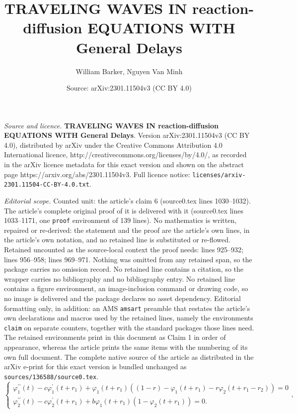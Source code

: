 \documentclass[10pt,a4paper]{amsart}
\title{\textbf{TRAVELING WAVES IN reaction-diffusion EQUATIONS WITH General Delays}}
\author{William Barker, Nguyen Van Minh}
\date{Source: arXiv:2301.11504v3 (CC BY 4.0)}
\begin{document}
\maketitle

\noindent\emph{Source and licence.} \textbf{TRAVELING WAVES IN reaction-diffusion EQUATIONS WITH General Delays}. Version arXiv:2301.11504v3 (CC BY 4.0), distributed by arXiv under the Creative Commons Attribution 4.0 International licence, http://creativecommons.org/licenses/by/4.0/, as recorded in the arXiv licence metadata for this exact version and shown on the abstract page https://arxiv.org/abs/2301.11504v3. Full licence notice: \texttt{licenses/arxiv-2301.11504-CC-BY-4.0.txt}.\par\smallskip

\noindent\textit{Editorial scope.} Counted unit: the article's claim 6 (source0.tex lines 1030--1032). The article's complete original proof of it is delivered with it (source0.tex lines 1033--1171, one \texttt{proof} environment of 139 lines). No mathematics is written, repaired or re-derived: the statement and the proof are the article's own lines, in the article's own notation, and no retained line is substituted or re-flowed.  Retained uncounted as the source-local context the proof needs: lines 925--932; lines 956--958; lines 969--971.  Nothing was omitted from any retained span, so the package carries no omission record.  No retained line contains a citation, so the wrapper carries no bibliography and no bibliography entry.  No retained line contains a figure environment, an image-inclusion command or drawing code, so no image is delivered and the package declares no asset dependency.  Editorial formatting only, in addition: an AMS \texttt{amsart} preamble that restates the article's own declarations and macros used by the retained lines, namely the environments \texttt{claim} on separate counters, together with the standard packages those lines need.  The retained environments print in this document as Claim 1 in order of appearance, whereas the article prints the same items with the numbering of its own full document.  The complete native source of the article as distributed in the arXiv e-print for this exact version is bundled unchanged as \texttt{sources/136588/source0.tex}.
\begin{equation}\label{waveBZ}
\begin{cases}
\varphi_{1}^{\prime\prime}(t)-c\varphi_{1}^{\prime}(t+r_1)+\varphi_{1}(t+r_1)\left(
(1-r)-\varphi_{1}(t+r_1)-r\varphi_{2}(t+r_1-r_2)\right)  =0\\
\varphi_{2}^{\prime\prime}(t)-c\varphi_{2}^{\prime}(t+r_1)+b\varphi_{1}(t+r_1)\left(
1-\varphi_{2}(t+r_1)\right)  =0.
\end{cases},
\end{equation}
\end{document}
